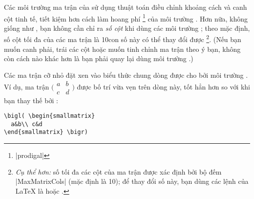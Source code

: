 \medskip
Các môi trường ma trận của  sử dụng thuật toán
điều chỉnh khoảng cách và canh cột tinh tế, tiết kiệm hơn cách làm hoang phí%
\footnote{|prodigal|} của môi trường .
Hơn nữa, không giống như , bạn không cần chỉ ra \emph{số cột}
khi dùng các môi trường ; theo mặc định, số cột tối đa của
các ma trận là 10\mdash con số này có thể thay đổi được%
\footnote{%
\emph{Cụ thể hơn:} số tối đa các cột của ma trận được xác định bởi bộ đếm |MaxMatrixCols|
(mặc định là 10); để thay đổi số này, bạn dùng các lệnh của \LaTeX{} là
 hoặc .
}.
(Nếu bạn muốn canh phải, trái các cột hoặc muốn tinh chỉnh ma trận theo ý bạn,
không còn cách nào khác hơn là bạn phải quay lại dùng môi trường .)

\medskip
Các ma trận cỡ nhỏ đặt xen vào biểu thức chung dòng được cho bởi
môi trường . Ví dụ, ma trận
\begin{math}
\bigl( \begin{smallmatrix}
  a&b\\ c&d
\end{smallmatrix} \bigr)
\end{math}
được bố trí vừa vẹn trên dòng này, tốt hẳn hơn so
với khi bạn thay thế  bởi :

\medskip
\begin{verbatim}
\bigl( \begin{smallmatrix}
  a&b\\ c&d
\end{smallmatrix} \bigr)
\end{verbatim}

